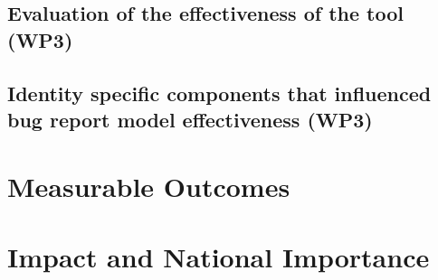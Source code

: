 \documentclass[11pt,english,twocolumn]{article}
\begin{document}
\subsection*{Evaluation of the effectiveness of the tool (WP3)}

\subsection*{Identity specific components that influenced bug report model effectiveness (WP3)}

\section{Measurable Outcomes}

\section{Impact and National Importance}

\let\oldbibliography\thebibliography
\renewcommand{\thebibliography}[1]{\oldbibliography{#1}
\setlength{\itemsep}{-3pt}}


{
\scriptsize

}
\end{document}
